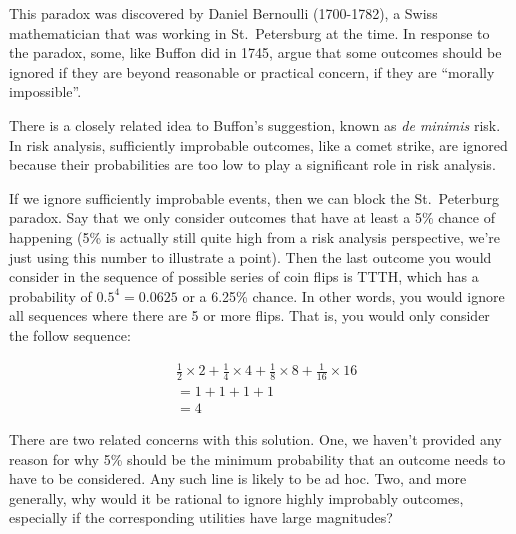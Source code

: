 \documentclass[]{tufte-book}
\begin{document}
This paradox was discovered by Daniel Bernoulli (1700-1782), a Swiss mathematician that was working in St.~Petersburg at the time. In response to the paradox, some, like Buffon did in 1745, argue that some outcomes should be ignored if they are beyond reasonable or practical concern, if they are ``morally impossible''.

There is a closely related idea to Buffon's suggestion, known as \emph{de minimis} risk. In risk analysis, sufficiently improbable outcomes, like a comet strike, are ignored because their probabilities are too low to play a significant role in risk analysis.

If we ignore sufficiently improbable events, then we can block the St.~Peterburg paradox. Say that we only consider outcomes that have at least a 5\% chance of happening (5\% is actually still quite high from a risk analysis perspective, we're just using this number to illustrate a point). Then the last outcome you would consider in the sequence of possible series of coin flips is TTTH, which has a probability of \(0.5^4=0.0625\) or a 6.25\% chance. In other words, you would ignore all sequences where there are 5 or more flips. That is, you would only consider the follow sequence:

\[
\begin{aligned}
&\frac{1}{2}\times 2 + \frac{1}{4}\times 4 + \frac{1}{8}\times 8 + \frac{1}{16}\times 16 \\
&= 1 + 1 + 1 + 1 \\
&= 4
\end{aligned}
\]

There are two related concerns with this solution. One, we haven't provided any reason for why 5\% should be the minimum probability that an outcome needs to have to be considered. Any such line is likely to be ad hoc. Two, and more generally, why would it be rational to ignore highly improbably outcomes, especially if the corresponding utilities have large magnitudes?
\end{document}
